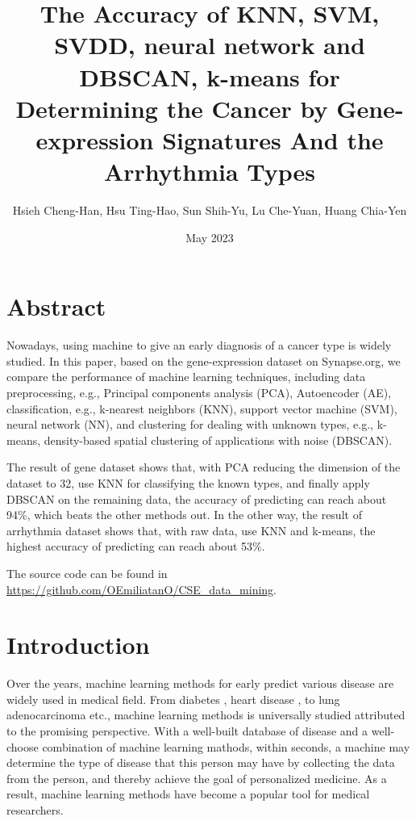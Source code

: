 \documentclass[twocolumn,10pt]{article}
\begin{document}
\title{The Accuracy of KNN, SVM, SVDD, neural network and DBSCAN, k-means for Determining the Cancer by Gene-expression Signatures And the Arrhythmia Types}

\author{Hsieh Cheng-Han, Hsu Ting-Hao, Sun Shih-Yu, Lu Che-Yuan, Huang Chia-Yen}
\date{May 2023}
\maketitle

\section*{Abstract}
Nowadays, using machine to give an early diagnosis of a cancer type is widely studied. 
In this paper, based on the gene-expression dataset on Synapse.org, we compare the performance of machine 
learning techniques, including data preprocessing, e.g., Principal components analysis (PCA), Autoencoder 
(AE), classification, e.g., k-nearest neighbors (KNN), support vector machine (SVM), neural network (NN), 
and clustering for dealing with unknown types, e.g., k-means, density-based spatial clustering of 
applications with noise (DBSCAN). 

The result of gene dataset shows that, with PCA reducing the dimension of the dataset to 32, use KNN for 
classifying the known types, and finally apply DBSCAN on the remaining data, the accuracy of predicting 
can reach about 94\%, which beats the other methods out. In the other way, the result of arrhythmia 
dataset shows that, with raw data, use KNN and k-means, the highest accuracy of predicting can reach about 
53\%.

The source code can be found in \href{https://github.com/OEmiliatanO/CSE\_data\_mining}{https://github.com/OEmiliatanO/CSE\_data\_mining}.

\section{Introduction}
\label{sec:Introduction}
Over the years, machine learning methods for early predict various disease are widely used in medical field. 
\cite{kourou2015machine} \cite{cruz2006applications} From diabetes \cite{kavakiotis2017machine}, 
heart disease \cite{learning2017heart}, to lung adenocarcinoma \cite{huang2020machine} etc., machine learning 
methods is universally studied attributed to the promising perspective. With a well-built database of disease 
and a well-choose combination of machine learning mathods, within seconds, a machine may determine the type of 
disease that this person may have by collecting the data from the person, and thereby achieve the goal of 
personalized medicine. As a result, machine learning methods have become a popular tool for medical researchers. 
\end{document}
